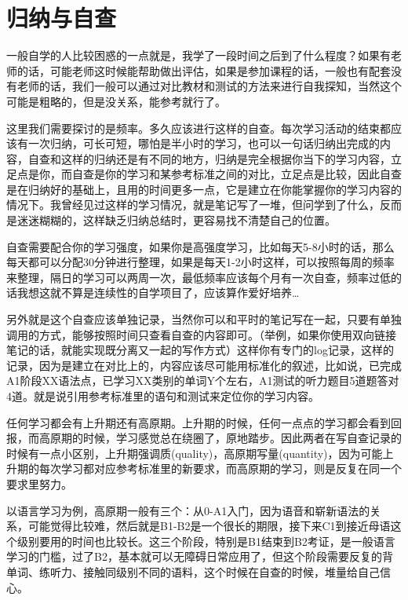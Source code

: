 \documentclass[
]{book}
\begin{document}
\hypertarget{ux5f52ux7eb3ux4e0eux81eaux67e5}{%
\section{归纳与自查}\label{ux5f52ux7eb3ux4e0eux81eaux67e5}}

一般自学的人比较困惑的一点就是，我学了一段时间之后到了什么程度？如果有老师的话，可能老师这时候能帮助做出评估，如果是参加课程的话，一般也有配套没有老师的话，我们一般可以通过对比教材和测试的方法来进行自我探知，当然这个可能是粗略的，但是没关系，能参考就行了。

这里我们需要探讨的是频率。多久应该进行这样的自查。每次学习活动的结束都应该有一次归纳，可长可短，哪怕是半小时的学习，也可以一句话归纳出完成的内容，自查和这样的归纳还是有不同的地方，归纳是完全根据你当下的学习内容，立足点是你，而自查是你的学习和某参考标准之间的对比，立足点是比较，因此自查是在归纳好的基础上，且用的时间更多一点，它是建立在你能掌握你的学习内容的情况下。我曾经见过这样的学习情况，就是笔记写了一堆，但问学到了什么，反而是迷迷糊糊的，这样缺乏归纳总结时，更容易找不清楚自己的位置。

自查需要配合你的学习强度，如果你是高强度学习，比如每天5-8小时的话，那么每天都可以分配30分钟进行整理，如果是每天1-2小时这样，可以按照每周的频率来整理，隔日的学习可以两周一次，最低频率应该每个月有一次自查，频率过低的话我想这就不算是连续性的自学项目了，应该算作爱好培养\ldots{}

另外就是这个自查应该单独记录，当然你可以和平时的笔记写在一起，只要有单独调用的方式，能够按照时间只查看自查的内容即可。（举例，如果你使用双向链接笔记的话，就能实现既分离又一起的写作方式）这样你有专门的log记录，这样的记录，因为是建立在对比上的，内容应该尽可能用标准化的叙述，比如说，已完成A1阶段XX语法点，已学习XX类别的单词Y个左右，A1测试的听力题目5道题答对4道。就是说引用参考标准里的语句和测试来定位你的学习内容。

任何学习都会有上升期还有高原期。上升期的时候，任何一点点的学习都会看到回报，而高原期的时候，学习感觉总在绕圈了，原地踏步。因此两者在写自查记录的时候有一点小区别，上升期强调质(quality)，高原期写量(quantity)，因为可能上升期的每次学习都对应参考标准里的新要求，而高原期的学习，则是反复在同一个要求里努力。

以语言学习为例，高原期一般有三个：从0-A1入门，因为语音和崭新语法的关系，可能觉得比较难，然后就是B1-B2是一个很长的期限，接下来C1到接近母语这个级别要用的时间也比较长。这三个阶段，特别是B1结束到B2考证，是一般语言学习的门槛，过了B2，基本就可以无障碍日常应用了，但这个阶段需要反复的背单词、练听力、接触同级别不同的语料，这个时候在自查的时候，堆量给自己信心。
\end{document}
